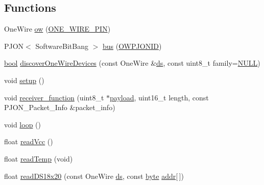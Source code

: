 \subsection*{Functions}
\begin{DoxyCompactItemize}
\item 
One\-Wire \hyperlink{OWP__DG__1w-adaptor_8ino_a53c83fb23c85b9fcc2903da7910645dc}{ow} (\hyperlink{OWP__DG__1w-adaptor_8ino_a394c6366a35129c8aece2e331c3263d5}{O\-N\-E\-\_\-\-W\-I\-R\-E\-\_\-\-P\-I\-N})
\item 
P\-J\-O\-N$<$ Software\-Bit\-Bang $>$ \hyperlink{OWP__DG__1w-adaptor_8ino_a5b555b33c74db25f14ae6a0906d55596}{bus} (\hyperlink{OWP__DG__Si7021__thermo-hygrometer_8ino_aff6283040066cbe0e6d17cbcd83abffc}{O\-W\-P\-J\-O\-N\-I\-D})
\item 
\hyperlink{stdbool_8h_abb452686968e48b67397da5f97445f5b}{bool} \hyperlink{OWP__DG__1w-adaptor_8ino_a7280c6634da12135cdb3ff5645c34e28}{discover\-One\-Wire\-Devices} (const One\-Wire \&\hyperlink{OWRain1_8ino_af75456870b9486275b406e13b003fb11}{ds}, const uint8\-\_\-t family=\hyperlink{stddef_8h_a070d2ce7b6bb7e5c05602aa8c308d0c4}{N\-U\-L\-L})
\item 
void \hyperlink{OWP__DG__1w-adaptor_8ino_a4fc01d736fe50cf5b977f755b675f11d}{setup} ()
\item 
void \hyperlink{OWP__DG__1w-adaptor_8ino_a76fc5e73c141f748dcc1809fdcfa1714}{receiver\-\_\-function} (uint8\-\_\-t $\ast$\hyperlink{Uno__Dragino__LoRa__GPS__Shield__TTN_8ino_a78a402d1762842473567de90b11ed256}{payload}, uint16\-\_\-t length, const P\-J\-O\-N\-\_\-\-Packet\-\_\-\-Info \&packet\-\_\-info)
\item 
void \hyperlink{OWP__DG__1w-adaptor_8ino_afe461d27b9c48d5921c00d521181f12f}{loop} ()
\item 
float \hyperlink{OWP__DG__1w-adaptor_8ino_a0b3195c3893f02cb1b80d878b89549d6}{read\-Vcc} ()
\item 
float \hyperlink{OWP__DG__1w-adaptor_8ino_ada109bb0cdc12131465dfe7a74f93b1e}{read\-Temp} (void)
\item 
float \hyperlink{OWP__DG__1w-adaptor_8ino_a871ed6a41673436aa85b1c06d1034594}{read\-D\-S18x20} (const One\-Wire \hyperlink{OWRain1_8ino_af75456870b9486275b406e13b003fb11}{ds}, const \hyperlink{Arduino_8h_ab8ef12fab634c171394422d0ee8baf94}{byte} \hyperlink{OWP__DG__1w-adaptor_8ino_a0fc5da2e63a94559429ec9aec32f1831}{addr}\mbox{[}$\,$\mbox{]})
\end{DoxyCompactItemize}

